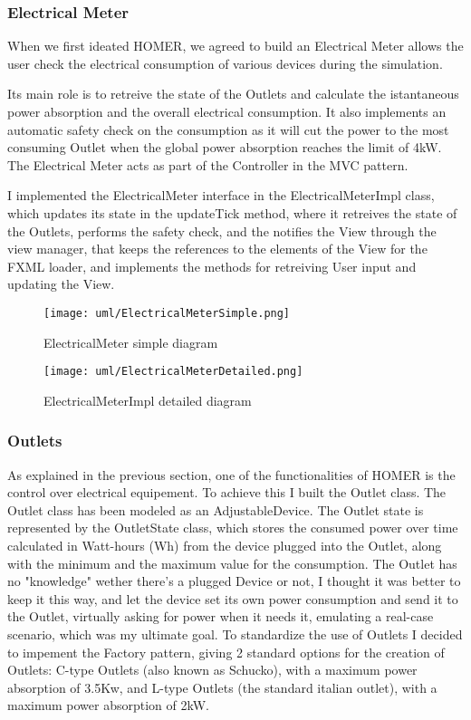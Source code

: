 \subsubsection*{Electrical Meter}
When we first ideated HOMER, we agreed to build an Electrical Meter allows the user check the electrical consumption of various devices during the simulation.

Its main role is to retreive the state of the Outlets and calculate the istantaneous power absorption and the overall electrical consumption.
It also implements an automatic safety check on the consumption as it will cut the power to the most consuming Outlet when the global power absorption reaches the limit of 4kW.
The Electrical Meter acts as part of the Controller in the MVC pattern. 

I implemented the ElectricalMeter interface in the ElectricalMeterImpl class, which updates its state in the updateTick method, where it retreives the state of the Outlets, 
performs the safety check, and the notifies the View through the view manager, that keeps the references to the elements of the View for the FXML loader, 
and implements the methods for retreiving User input and updating the View.

\begin{figure}[H]
    \centering{}
    \texttt{[image: uml/ElectricalMeterSimple.png]}
    \caption{ElectricalMeter simple diagram}
    \label{monticelli:uml:simpleMeter}
\end{figure}

\begin{figure}[H]
    \centering{}
    \texttt{[image: uml/ElectricalMeterDetailed.png]}
    \caption{ElectricalMeterImpl detailed diagram}
    \label{monticelli:uml:detailedMeter}
\end{figure}

\subsubsection{Outlets}
As explained in the previous section, one of the functionalities of HOMER is the control over electrical equipement. To achieve this I built the Outlet class.
The Outlet class has been modeled as an AdjustableDevice.
The Outlet state is represented by the OutletState class, which stores the consumed power over time calculated in Watt-hours (Wh) from the device plugged into the Outlet, along with the minimum and the maximum value for the consumption.
The Outlet has no "knowledge" wether there's a plugged Device or not, I thought it was better to keep it this way, and let the device set its own power consumption and send it to the Outlet, virtually asking for power when it needs it, emulating a real-case scenario, 
which was my ultimate goal.
To standardize the use of Outlets I decided to impement the Factory pattern, giving 2 standard options for the creation of Outlets: C-type Outlets (also known as Schucko), with a maximum power absorption of 3.5Kw, 
and L-type Outlets (the standard italian outlet), with a maximum power absorption of 2kW.

